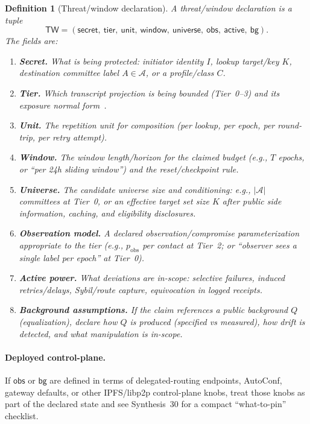 \documentclass[11pt]{article}
\newtheorem{definition}{Definition}
\begin{document}
\begin{definition}[Threat/window declaration]
A threat/window declaration is a tuple
\[
\mathsf{TW}=(\mathsf{secret},\ \mathsf{tier},\ \mathsf{unit},\ \mathsf{window},\ \mathsf{universe},\ \mathsf{obs},\ \mathsf{active},\ \mathsf{bg}).
\]
The fields are:
\begin{enumerate}[leftmargin=*]
\item \textbf{Secret.} What is being protected: initiator identity $I$, lookup target/key $K$, destination committee label $A\in\mathcal A$, or a profile/class $C$.
\item \textbf{Tier.} Which transcript projection is being bounded (Tier~0--3) and its exposure normal form~\cite{series:traceifaces}.
\item \textbf{Unit.} The repetition unit for composition (per lookup, per epoch, per round-trip, per retry attempt).
\item \textbf{Window.} The window length/horizon for the claimed budget (e.g., $T$ epochs, or ``per 24h sliding window'') and the reset/checkpoint rule.
\item \textbf{Universe.} The candidate universe size and conditioning: e.g., $|\mathcal A|$ committees at Tier~0, or an effective target set size $K$ after public side information, caching, and eligibility disclosures.
\item \textbf{Observation model.} A declared observation/compromise parameterization appropriate to the tier (e.g., $p_{\mathrm{obs}}$ per contact at Tier~2; or ``observer sees a single label per epoch'' at Tier~0).
\item \textbf{Active power.} What deviations are in-scope: selective failures, induced retries/delays, Sybil/route capture, equivocation in logged receipts.
\item \textbf{Background assumptions.} If the claim references a public background $Q$ (equalization), declare how $Q$ is produced (specified vs measured), how drift is detected, and what manipulation is in-scope.
\end{enumerate}
\end{definition}

\paragraph{Deployed control-plane.}
If $\mathsf{obs}$ or $\mathsf{bg}$ are defined in terms of delegated-routing endpoints, AutoConf, gateway defaults, or other IPFS/libp2p control-plane knobs,
treat those knobs as part of the declared state and see Synthesis~30 for a compact ``what-to-pin'' checklist.\cite{series:deployedsurfaces}
\end{document}
